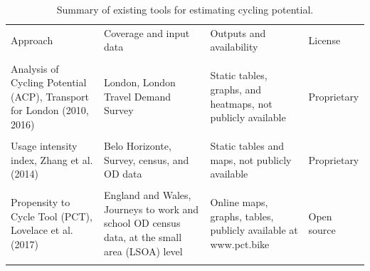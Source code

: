 \documentclass[
  super,
  preprint,
  3p]{elsarticle}
\begin{document}
\begin{longtable}[t]{>{\raggedright\arraybackslash}p{13em}>{\raggedright\arraybackslash}p{15em}>{\raggedright\arraybackslash}p{12em}>{\raggedright\arraybackslash}p{5em}}

\caption{\label{tbl-tools}Summary of existing tools for estimating
cycling potential.}

\tabularnewline

\\
\toprule
Approach & Coverage and input data & Outputs and availability & License\\
\midrule
\cellcolor{gray!10}{Bicycle share model, Parkin et al. (2007)} & \cellcolor{gray!10}{England and Wales, Journeys to work OD census data, at the small-area (wards) level} & \cellcolor{gray!10}{Static tables in academic paper} & \cellcolor{gray!10}{Proprietary}\\
Analysis of  Cycling Potential (ACP), Transport for London (2010, 2016) & London, London Travel Demand Survey & Static tables, graphs, and heatmaps, not publicly available & Proprietary\\
\cellcolor{gray!10}{Prioritization index, Larsen et al. (2013)} & \cellcolor{gray!10}{Montreal, Survey, Road safety, and OD data} & \cellcolor{gray!10}{Map-based heatmap, not publicly available} & \cellcolor{gray!10}{Proprietary}\\
Usage intensity index, Zhang et al. (2014) & Belo Horizonte, Survey, census, and OD data & Static tables and maps, not publicly available & Proprietary\\
\cellcolor{gray!10}{The Cycling Potential Tool (CPT), Phillips and Range (2017)} & \cellcolor{gray!10}{Scotland, Environmental and socioeconomic data, at the small area (output areas) level} & \cellcolor{gray!10}{Maps showing cycling potential in each area} & \cellcolor{gray!10}{Proprietary}\\
\addlinespace
Propensity to Cycle Tool (PCT), Lovelace et al. (2017) & England and Wales, Journeys to work and school OD census data, at the small area (LSOA) level & Online maps, graphs, tables, publicly available at www.pct.bike & Open source\\
\cellcolor{gray!10}{The    Gross Potential for Cycling tool (CPC), Silva et al. (2021 and 2022)} & \cellcolor{gray!10}{21 Portuguese cities, Land use and socio-demographic data, at the small area (census tract) level} & \cellcolor{gray!10}{Static maps showing cycling potential in different areas} & \cellcolor{gray!10}{NA}\\
\bottomrule

\end{longtable}
\end{document}

